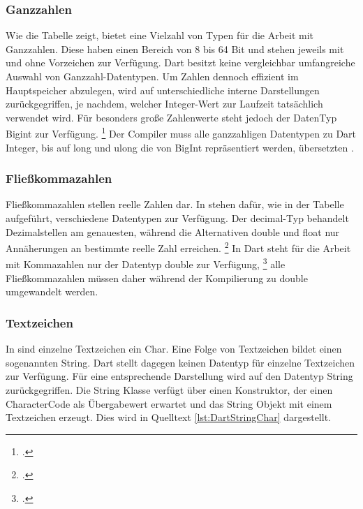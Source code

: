 \subsubsection{Ganzzahlen}
Wie die Tabelle zeigt,  bietet \Csharp{} eine Vielzahl von Typen für die Arbeit mit Ganzzahlen.  Diese haben einen Bereich von 8 bis 64 Bit und stehen jeweils mit und ohne Vorzeichen zur Verfügung.  Dart besitzt keine vergleichbar umfangreiche Auswahl von Ganzzahl-Datentypen.  Um Zahlen dennoch effizient im Hauptspeicher abzulegen, wird auf unterschiedliche interne Darstellungen zurückgegriffen, je nachdem,  welcher Integer-Wert zur Laufzeit tatsächlich verwendet wird.  Für besonders große Zahlenwerte steht jedoch der DatenTyp \glq Bigint\grq{}  zur Verfügung.  \footcite[Vgl. ][Abgerufen am \today]{Ford2019} Der Compiler muss alle ganzzahligen  \Csharp{} Datentypen zu Dart \glq Integer\grq,  bis auf \glq long\grq{} und \glq ulong\grq{} die von \glq BigInt\grq{}  repräsentiert werden, übersetzten . 

\subsubsection{Fließkommazahlen}


Fließkommazahlen stellen reelle Zahlen dar.  In \Csharp{} stehen dafür, wie in der Tabelle aufgeführt,  verschiedene Datentypen zur Verfügung.  Der \glq decimal\grq -Typ behandelt Dezimalstellen am genauesten,  während die Alternativen \glq double\grq{} und  \glq float\grq{} nur Annäherungen an bestimmte reelle Zahl erreichen.  \footcite[Vgl. ][Abgerufen am \today]{MicrosoftFlieskomma2021}
In Dart steht für die Arbeit mit Kommazahlen nur der Datentyp \glq  double\grq{} zur Verfügung, \footcite[Vgl. ][Abgerufen am \today]{GoogleDouble} alle Fließkommazahlen müssen daher während der Kompilierung zu \glq double\grq{} umgewandelt werden.

\subsubsection{Textzeichen}

In \Csharp{} sind einzelne Textzeichen ein \glq  Char\grq .  Eine Folge von Textzeichen bildet einen  sogenannten \glq  String\grq.  Dart stellt dagegen keinen Datentyp für einzelne Textzeichen zur Verfügung.  Für eine entsprechende Darstellung wird auf den Datentyp \glq  String\grq{} zurückgegriffen.  Die  \glq String\grq{} Klasse verfügt über einen Konstruktor, der einen \glq CharacterCode\grq{} als Übergabewert erwartet und das String Objekt mit einem  Textzeichen erzeugt. Dies wird in Quelltext \ref{lst:DartStringChar} dargestellt.




